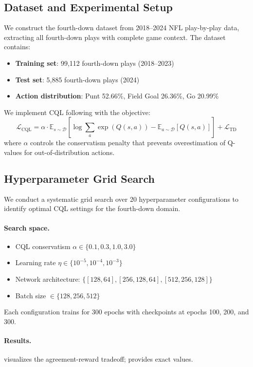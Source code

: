 \subsection{Dataset and Experimental Setup}

We construct the fourth-down dataset from 2018--2024 NFL play-by-play data, extracting all fourth-down plays with complete game context. The dataset contains:
\begin{itemize}
    \item \textbf{Training set}: 99,112 fourth-down plays (2018--2023)
    \item \textbf{Test set}: 5,885 fourth-down plays (2024)
    \item \textbf{Action distribution}: Punt 52.66\%, Field Goal 26.36\%, Go 20.99\%
\end{itemize}

We implement CQL following \citet{kumar2020} with the objective:
\[
\mathcal{L}_{\text{CQL}} = \alpha \cdot \mathbb{E}_{s \sim \mathcal{D}}\left[\log \sum_a \exp(Q(s,a)) - \mathbb{E}_{a \sim \mathcal{D}}[Q(s,a)]\right] + \mathcal{L}_{\text{TD}}
\]
where $\alpha$ controls the conservatism penalty that prevents overestimation of Q-values for out-of-distribution actions.

\subsection{Hyperparameter Grid Search}

We conduct a systematic grid search over 20 hyperparameter configurations to identify optimal CQL settings for the fourth-down domain.

\paragraph{Search space.}
\begin{itemize}
    \item CQL conservatism $\alpha \in \{0.1, 0.3, 1.0, 3.0\}$
    \item Learning rate $\eta \in \{10^{-5}, 10^{-4}, 10^{-3}\}$
    \item Network architecture: $\{[128, 64], [256, 128, 64], [512, 256, 128]\}$
    \item Batch size $\in \{128, 256, 512\}$
\end{itemize}

Each configuration trains for 300 epochs with checkpoints at epochs 100, 200, and 300.

\paragraph{Results.}
 visualizes the agreement-reward tradeoff;  provides exact values.

